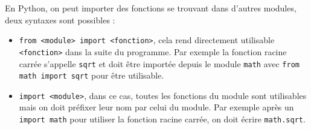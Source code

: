 \documentclass[11pt,a4paper]{article}
\begin{document}
\begin{tcolorbox}[left=0cm,title=\bf{\faPython \; Importation de fonctions},colbacktitle=cfond]
		En Python, on peut importer des fonctions se trouvant dans d'autres modules, deux syntaxes sont possibles :
		\begin{itemize}
			\item[\textbullet] {\tt from <module> import <fonction>}, cela rend directement utilisable {\tt <fonction>} dans la suite du programme. Par exemple la fonction racine carrée s'appelle \texttt{sqrt} et doit être importée depuis le module \texttt{math} avec \texttt{from math import sqrt} pour être utilisable.
			\item[\textbullet] {\tt import <module>}, dans ce cas, toutes les fonctions du module sont utilisables mais on doit préfixer leur nom par celui du module. Par exemple après un \texttt{import math} pour utiliser la fonction racine carrée, on doit écrire \texttt{math.sqrt}.
		\end{itemize}
	\end{tcolorbox}
\end{document}

